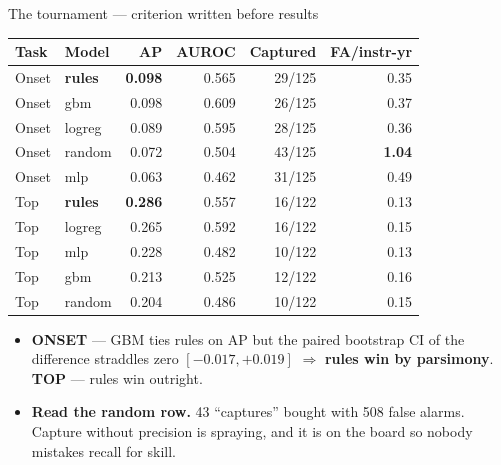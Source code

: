 \documentclass[aspectratio=169,11pt]{beamer}
\begin{document}
\begin{frame}{The tournament --- criterion written before results}
  \scriptsize
  \begin{table}
    \begin{tabular}{@{}llrrrr@{}}
      \toprule
      \textbf{Task} & \textbf{Model} & \textbf{AP} & \textbf{AUROC}
      & \textbf{Captured} & \textbf{FA/instr-yr} \\
      \midrule
      Onset & \textbf{rules} & \textbf{0.098} & 0.565 & 29/125 & 0.35 \\
      Onset & gbm            & 0.098 & 0.609 & 26/125 & 0.37 \\
      Onset & logreg         & 0.089 & 0.595 & 28/125 & 0.36 \\
      Onset & random         & 0.072 & 0.504 & 43/125 & \textbf{1.04} \\
      Onset & mlp            & 0.063 & 0.462 & 31/125 & 0.49 \\
      \addlinespace
      Top   & \textbf{rules} & \textbf{0.286} & 0.557 & 16/122 & 0.13 \\
      Top   & logreg         & 0.265 & 0.592 & 16/122 & 0.15 \\
      Top   & mlp            & 0.228 & 0.482 & 10/122 & 0.13 \\
      Top   & gbm            & 0.213 & 0.525 & 12/122 & 0.16 \\
      Top   & random         & 0.204 & 0.486 & 10/122 & 0.15 \\
      \bottomrule
    \end{tabular}
  \end{table}
  \vspace{0.2em}
  \begin{itemize}\footnotesize
    \item \textbf{ONSET} --- GBM ties rules on AP but the paired bootstrap CI
      of the difference straddles zero $[-0.017,+0.019]$
      $\Rightarrow$ \textbf{rules win by parsimony}. \textbf{TOP} --- rules
      win outright.
    \item \textbf{Read the random row.} 43 ``captures'' bought with 508 false
      alarms. Capture without precision is spraying, and it is on the board so
      nobody mistakes recall for skill.
  \end{itemize}
\end{frame}
\end{document}
